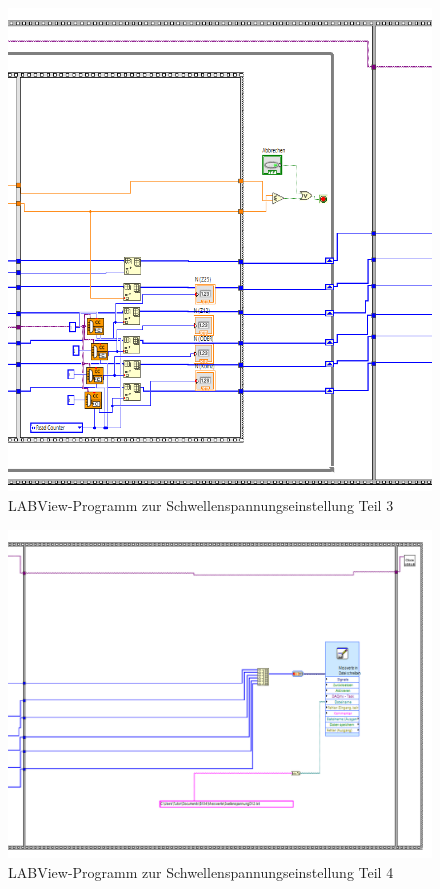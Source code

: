 \documentclass{article}
\begin{document}
\begin{figure}[H]
    \centering
    \includegraphics[width=1\textwidth]{figures/ProgrammScreen3.png}
    \caption{LABView-Programm zur Schwellenspannungseinstellung Teil 3}
    \label{fig:LABView3}
\end{figure}
\begin{figure}[H]
    \centering
    \includegraphics[width=1\textwidth]{figures/ProgrammScreen4.png}
    \caption{LABView-Programm zur Schwellenspannungseinstellung Teil 4}
    \label{fig:LABView4}
\end{figure}
\end{document}
